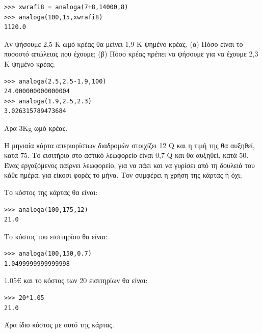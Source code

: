 \begin{lstlisting}
>>> xwrafi8 = analoga(7+8,14000,8)
>>> analoga(100,15,xwrafi8)
1120.0
\end{lstlisting}
\begin{exercise}
Αν	ψήσουμε	2,5	Κ	ωμό	κρέας	θα	μείνει	1,9	K	ψημένο	κρέας. (α)		Πόσο	είναι	το	ποσοστό	απώλειας	που	έχουμε; (β)		Πόσο	κρέας	πρέπει	να	ψήσουμε	για	να	έχουμε	2,3	K	ψημένο	κρέας;
\end{exercise}
\begin{lstlisting}
>>> analoga(2.5,2.5-1.9,100)
24.000000000000004
>>> analoga(1.9,2.5,2.3)
3.026315789473684
\end{lstlisting}
Άρα 3Kg ωμό κρέας.
\begin{exercise}
Η	μηνιαία	κάρτα	απεριορίστων	διαδρομών	στοιχίζει	12	Q	και	η	τιμή	της	θα	αυξηθεί,	κατά	75.	Το	εισιτήριο	στο	αστικό	λεωφορείο	είναι	0,7	Q	και	θα	αυξηθεί,	κατά	50.	Ένας	εργαζόμενος	παίρνει	λεωφορείο,	για	να	πάει	και	να	γυρίσει	από	τη	δουλειά	του	κάθε	ημέρα,	για	είκοσι	φορές	το	μήνα.	Τον	συμφέρει	η	χρήση	της	κάρτας	ή	όχι;
\end{exercise}
Το κόστος της κάρτας θα είναι:
\begin{lstlisting}
>>> analoga(100,175,12)
21.0
\end{lstlisting}
Το κόστος του εισιτηρίου θα είναι:
\begin{lstlisting}
>>> analoga(100,150,0.7)
1.0499999999999998
\end{lstlisting}
1.05€
και το κόστος των 20 εισιτηρίων θα είναι:
\begin{lstlisting}
>>> 20*1.05
21.0
\end{lstlisting}
Άρα ίδιο κόστος με αυτό της κάρτας.


